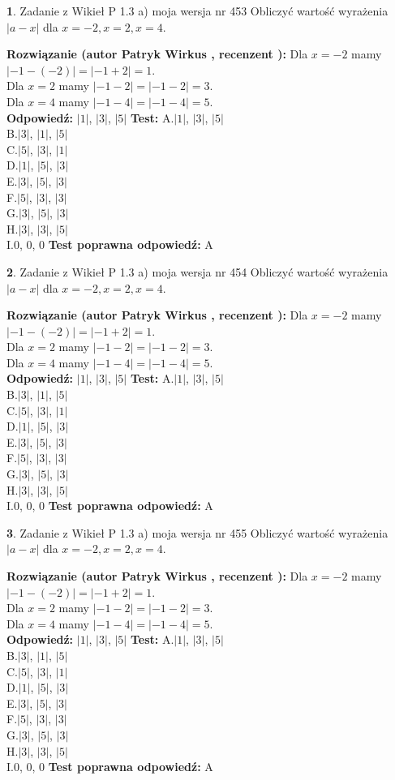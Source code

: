 \documentclass[12pt, a4paper]{article}
\theoremstyle{definition} %
\newtheorem{zad}{}
\newcommand{\zadStart}[1]{\begin{zad}#1\newline}
\newcommand{\zadStop}{\end{zad}}
\newcommand{\rozwStart}[2]{\noindent \textbf{Rozwiązanie (autor #1 , recenzent #2): }\newline}
\newcommand{\rozwStop}{\newline}
\newcommand{\odpStart}{\noindent \textbf{Odpowiedź:}\newline}
\newcommand{\odpStop}{\newline}
\newcommand{\testStart}{\noindent \textbf{Test:}\newline}
\newcommand{\testStop}{\newline}
\newcommand{\kluczStart}{\noindent \textbf{Test poprawna odpowiedź:}\newline}
\newcommand{\kluczStop}{\newline}
\begin{document}
\zadStart{Zadanie z Wikieł P 1.3 a) moja wersja nr 453}
Obliczyć wartość wyrażenia $|a - x|$ dla $x=-2,x=2,x=4$.
\zadStop
\rozwStart{Patryk Wirkus}{}
Dla $x = -2$ mamy $|-1 - (-2)| = |-1 + 2| = 1$.\\
Dla $x = 2$ mamy $|-1 - 2| = |-1 - 2| = 3$.\\
Dla $x = 4$ mamy $|-1 - 4| = |-1 - 4| = 5$.\\
\rozwStop
\odpStart
$|1|$, $|3|$, $|5|$
\odpStop
\testStart
A.$|1|$, $|3|$, $|5|$\\
B.$|3|$, $|1|$, $|5|$\\
C.$|5|$, $|3|$, $|1|$\\
D.$|1|$, $|5|$, $|3|$\\
E.$|3|$, $|5|$, $|3|$\\
F.$|5|$, $|3|$, $|3|$\\
G.$|3|$, $|5|$, $|3|$\\
H.$|3|$, $|3|$, $|5|$\\
I.$0$, $0$, $0$
\testStop
\kluczStart
A
\kluczStop



\zadStart{Zadanie z Wikieł P 1.3 a) moja wersja nr 454}
Obliczyć wartość wyrażenia $|a - x|$ dla $x=-2,x=2,x=4$.
\zadStop
\rozwStart{Patryk Wirkus}{}
Dla $x = -2$ mamy $|-1 - (-2)| = |-1 + 2| = 1$.\\
Dla $x = 2$ mamy $|-1 - 2| = |-1 - 2| = 3$.\\
Dla $x = 4$ mamy $|-1 - 4| = |-1 - 4| = 5$.\\
\rozwStop
\odpStart
$|1|$, $|3|$, $|5|$
\odpStop
\testStart
A.$|1|$, $|3|$, $|5|$\\
B.$|3|$, $|1|$, $|5|$\\
C.$|5|$, $|3|$, $|1|$\\
D.$|1|$, $|5|$, $|3|$\\
E.$|3|$, $|5|$, $|3|$\\
F.$|5|$, $|3|$, $|3|$\\
G.$|3|$, $|5|$, $|3|$\\
H.$|3|$, $|3|$, $|5|$\\
I.$0$, $0$, $0$
\testStop
\kluczStart
A
\kluczStop



\zadStart{Zadanie z Wikieł P 1.3 a) moja wersja nr 455}
Obliczyć wartość wyrażenia $|a - x|$ dla $x=-2,x=2,x=4$.
\zadStop
\rozwStart{Patryk Wirkus}{}
Dla $x = -2$ mamy $|-1 - (-2)| = |-1 + 2| = 1$.\\
Dla $x = 2$ mamy $|-1 - 2| = |-1 - 2| = 3$.\\
Dla $x = 4$ mamy $|-1 - 4| = |-1 - 4| = 5$.\\
\rozwStop
\odpStart
$|1|$, $|3|$, $|5|$
\odpStop
\testStart
A.$|1|$, $|3|$, $|5|$\\
B.$|3|$, $|1|$, $|5|$\\
C.$|5|$, $|3|$, $|1|$\\
D.$|1|$, $|5|$, $|3|$\\
E.$|3|$, $|5|$, $|3|$\\
F.$|5|$, $|3|$, $|3|$\\
G.$|3|$, $|5|$, $|3|$\\
H.$|3|$, $|3|$, $|5|$\\
I.$0$, $0$, $0$
\testStop
\kluczStart
A
\kluczStop
\end{document}
